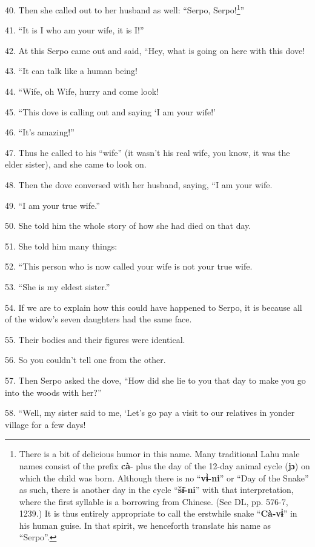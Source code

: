 40. Then she called out to her husband as well: ``Serpo, Serpo!\footnote{There is a bit of delicious humor in this name. Many traditional Lahu male names consist of the prefix \textbf{cà}- plus the day of the 12-day animal cycle (\textbf{jɔ}) on which the child was born. Although there is no ``\textbf{vɨ̀-ni}'' or ``Day of the Snake'' as such, there is another day in the cycle ``\textbf{šɨ̄-ni}'' with that interpretation, where the first syllable is a borrowing from Chinese. (See DL, pp. 576-7, 1239.) It is thus entirely appropriate to call the erstwhile snake ``\textbf{Cà-vɨ̀}'' in his human guise. In that spirit, we henceforth translate his name as ``Serpo''.}''

41. ``It is I who am your wife, it is I!''

42. At this Serpo came out and said, ``Hey, what is going on here with
this dove!

43. ``It can talk like a human being!

44. ``Wife, oh Wife, hurry and come look!

45. ``This dove is calling out and saying `I am your wife!'

46. ``It's amazing!''

47. Thus he called to his ``wife'' (it wasn't his real wife, you
know, it was the elder sister), and she came to look on.

48. Then the dove conversed with her husband, saying, ``I am your wife.

49. ``I am your true wife.''

50. She told him the whole story of how she had died on that day.

51. She told him many things:

52. ``This person who is now called your wife is not your true wife.

53. ``She is my eldest sister.''

54. If we are to explain how this could have happened to Serpo, it is because all
of the widow's seven daughters had the same face.

55. Their bodies and their figures were identical.

56. So you couldn't tell one from the other.

57. Then Serpo asked the dove, ``How did she lie to you that day to make
you go into the woods with her?''

58. ``Well, my sister said to me, `Let's go pay a visit to our relatives
in yonder village for a few days!

